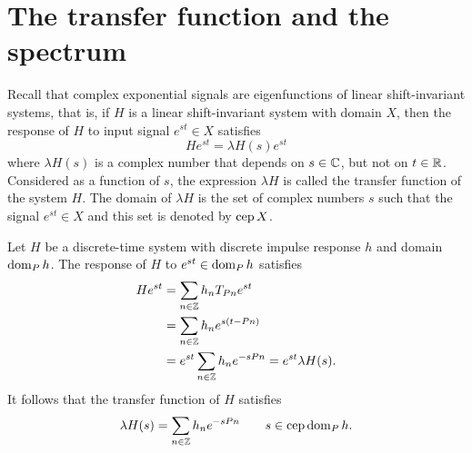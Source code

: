 \section{The transfer function and the spectrum}

Recall that complex exponential signals are eigenfunctions of linear shift-invariant systems, that is, if $H$ is a linear shift-invariant system with domain $X$, then the response of $H$ to input signal $e^{st} \in X$ satisfies
 \[
He^{st} = \lambda H(s) e^{st}
\]
where $\lambda H(s)$ is a complex number that depends on $s \in {\mathbb C}$, but not on $t \in {\mathbb R}$.  Considered as a function of $s$, the expression $\lambda H$ is called the transfer function of the system $H$.  The domain of $\lambda H$ is the set of complex numbers $s$ such that the signal $e^{st} \in X$ and this set is denoted by $\operatorname{cep} X$.

Let $H$ be a discrete-time system with discrete impulse response $h$ and domain $\operatorname{dom}_P h$.  The response of $H$ to $e^{st} \in \operatorname{dom}_P h$ satisfies
\begin{align*}
H e^{st} &= \sum_{n \in {\mathbb Z}} h_n T_{Pn} e^{st} \\
&= \sum_{n \in {\mathbb Z}} h_n e^{s(t-Pn)} \\
&= e^{st} \sum_{n \in {\mathbb Z}} h_n e^{-sPn} = e^{st} \lambda H(s).
\end{align*}
It follows that the transfer function of $H$ satisfies
\[
\lambda H(s) = \sum_{n \in {\mathbb Z}} h_n e^{-sPn} \qquad s \in \operatorname{cep} \operatorname{dom}_P h.
\]

